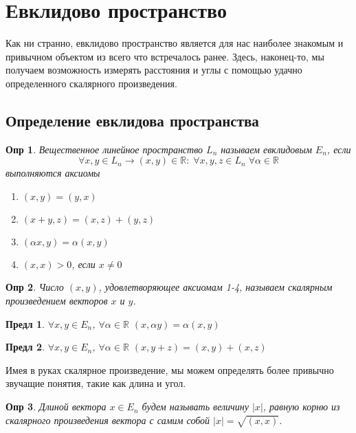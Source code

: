 \documentclass[a4paper,12pt]{article}
\newtheorem*{definition}{Опр}
\newtheorem{propos}{Предл}[section]
\begin{document}
\section{Евклидово пространство}

Как ни странно, евклидово пространство является для нас наиболее знакомым и привычном объектом из всего что встречалось ранее. Здесь, наконец-то, мы получаем возможность измерять расстояния и углы с помощью удачно определенного скалярного произведения. 

\subsection{Определение евклидова пространства}
\begin{definition}
	Вещественное линейное пространство $L_n$ называем евклидовым $E_n$, если 
	\[
		\forall x,y \in L_n \to (x,y) \in \mathbb{R}: \; \forall x,y,z \in L_n \; \forall \alpha \in \mathbb{R}
	\]	
	выполняются аксиомы
	\begin{enumerate}
		\item $(x,y) = (y,x)$
		\item $(x+y, z) = (x,z) + (y,z)$
		\item $(\alpha x, y ) = \alpha(x,y)$
		\item $(x, x) > 0$, если $x \ne 0$
	\end{enumerate}
\end{definition}

\begin{definition}
	Число $(x,y)$, удовлетворяющее аксиомам 1-4, называем скалярным произведением векторов $x$ и $y$.
\end{definition}

\begin{propos}
	$\forall x,y \in E_n$, $\forall \alpha \in \mathbb{R}$ $(x, \alpha y) = \alpha (x,y)$
\end{propos}

\begin{propos}
	$\forall x,y \in E_n$, $\forall \alpha \in \mathbb{R}$ $(x, y + z) =  (x,y) + (x,z)$
\end{propos}

Имея в руках скалярное произведение, мы можем определять более привычно звучащие понятия, такие как длина и угол.

\begin{definition}
	Длиной вектора $x \in E_n$ будем называть величину $|x|$, равную корню из скалярного произведения вектора с самим собой $|x| = \sqrt{(x,x)}$.
\end{definition}
\end{document}
